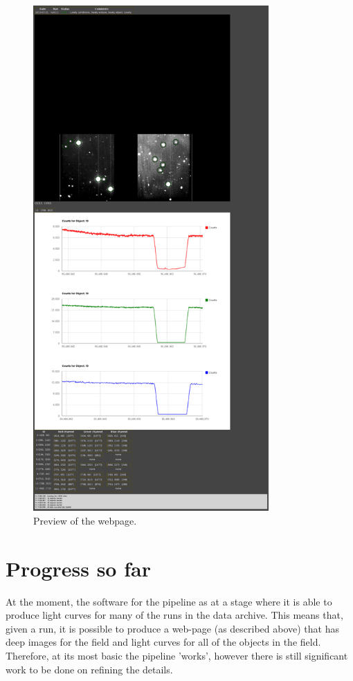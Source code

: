 \documentclass[a4paper,10pt]{article}
\begin{document}
\begin{figure}[!h]
	\centering
	\includegraphics[width=90mm]{images/browser.png}
	\caption{Preview of the webpage.}
	\label{browser}
\end{figure}

\section{Progress so far}
At the moment, the software for the pipeline as at a stage where it is able to produce light curves for many of the runs in the data archive. This means that, given a run, it is possible to produce a web-page (as described above) that has deep images for the field and light curves for all of the objects in the field. Therefore, at its most basic the pipeline 'works', however there is still significant work to be done on refining the details. 
\end{document}
